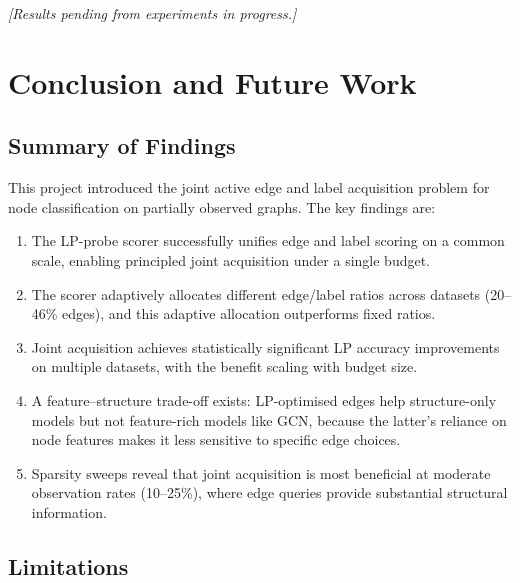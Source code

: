 \documentclass[12pt,a4paper,oneside]{report}
\begin{document}
\textit{[Results pending from experiments in progress.]}


\chapter{Conclusion and Future Work}
\label{ch:conclusion}

\section{Summary of Findings}

This project introduced the joint active edge and label acquisition problem for node classification on partially observed graphs. The key findings are:

\begin{enumerate}[leftmargin=2em]
    \item The LP-probe scorer successfully unifies edge and label scoring on a common scale, enabling principled joint acquisition under a single budget.

    \item The scorer adaptively allocates different edge/label ratios across datasets (20--46\% edges), and this adaptive allocation outperforms fixed ratios.

    \item Joint acquisition achieves statistically significant LP accuracy improvements on multiple datasets, with the benefit scaling with budget size.

    \item A feature--structure trade-off exists: LP-optimised edges help structure-only models but not feature-rich models like GCN, because the latter's reliance on node features makes it less sensitive to specific edge choices.

    \item Sparsity sweeps reveal that joint acquisition is most beneficial at moderate observation rates (10--25\%), where edge queries provide substantial structural information.
\end{enumerate}

\section{Limitations}
\end{document}
